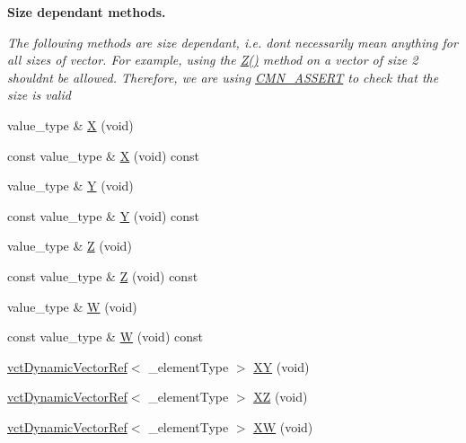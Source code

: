 \begin{Indent}{\bf Size dependant methods.}\par
{\em The following methods are size dependant, i.\+e. don\textquotesingle{}t necessarily mean anything for all sizes of vector. For example, using the \hyperlink{classvct_dynamic_vector_base_aa689aa7d7b29bd5f370fd3a4f526419c}{Z()} method on a vector of size 2 shouldn\textquotesingle{}t be allowed. Therefore, we are using \hyperlink{group__cisst_common_ga6a12b7031ea38ac5bf5937b8633c97ff}{C\+M\+N\+\_\+\+A\+S\+S\+E\+R\+T} to check that the size is valid }\begin{DoxyCompactItemize}
\item 
value\+\_\+type \& \hyperlink{classvct_dynamic_vector_base_ac1c2e4fabde849a5adc380e763f5a5a0}{X} (void)
\item 
const value\+\_\+type \& \hyperlink{classvct_dynamic_vector_base_a23d6b86c6aeda2974ec731e6e5b32286}{X} (void) const 
\item 
value\+\_\+type \& \hyperlink{classvct_dynamic_vector_base_ac824e0b7985c1665f8bb90c098f6bb1e}{Y} (void)
\item 
const value\+\_\+type \& \hyperlink{classvct_dynamic_vector_base_a7a7f871ea3a0350db5ee5da093426850}{Y} (void) const 
\item 
value\+\_\+type \& \hyperlink{classvct_dynamic_vector_base_aa689aa7d7b29bd5f370fd3a4f526419c}{Z} (void)
\item 
const value\+\_\+type \& \hyperlink{classvct_dynamic_vector_base_a933e0e8e08d777d86a02432d2568df47}{Z} (void) const 
\item 
value\+\_\+type \& \hyperlink{classvct_dynamic_vector_base_acdbaaa52e7ec8209050a6edac83e363a}{W} (void)
\item 
const value\+\_\+type \& \hyperlink{classvct_dynamic_vector_base_aef2206a0cf3908da039e445207990a66}{W} (void) const 
\item 
\hyperlink{classvct_dynamic_vector_ref}{vct\+Dynamic\+Vector\+Ref}$<$ \+\_\+element\+Type $>$ \hyperlink{classvct_dynamic_vector_base_ac5eb55ee30f87e702d1bcb521739c923}{X\+Y} (void)
\item 
\hyperlink{classvct_dynamic_vector_ref}{vct\+Dynamic\+Vector\+Ref}$<$ \+\_\+element\+Type $>$ \hyperlink{classvct_dynamic_vector_base_a89314df61e7549d378549ccb87ac626b}{X\+Z} (void)
\item 
\hyperlink{classvct_dynamic_vector_ref}{vct\+Dynamic\+Vector\+Ref}$<$ \+\_\+element\+Type $>$ \hyperlink{classvct_dynamic_vector_base_a8c0bad5e6b534f05a395cf4332829427}{X\+W} (void)
\item 

\end{DoxyCompactItemize}
\end{Indent}
